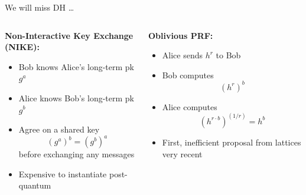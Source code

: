 \documentclass[xcolor=table,10pt,aspectratio=169]{beamer}
\begin{document}
\begin{frame}[label={sec:org23a0d9a}]{We will miss DH …}
\begin{columns}[t]
\begin{column}[t]{0.5\columnwidth}
\textbf{Non-Interactive Key Exchange (NIKE):}
\begin{itemize}
\item Bob knows Alice’s long-term pk \(g^a\)
\item Alice knows Bob’s long-term pk \(g^b\)
\item Agree on a shared key  \[(g^a)^b = (g^b)^a\] before exchanging any messages
\item Expensive to instantiate post-quantum
\end{itemize}
\end{column}

\begin{column}[t]{0.5\columnwidth}
\textbf{Oblivious PRF:}
\begin{itemize}
\item Alice sends \(h^{r}\) to Bob
\item Bob computes \[(h^{r})^b\]
\item Alice computes \[(h^{r \cdot b})^{(1/r)} = h^b\]
\item First, inefficient proposal from lattices very recent
\end{itemize}
\end{column}
\end{columns}
\end{frame}
\end{document}
